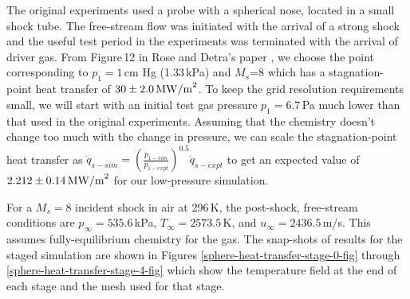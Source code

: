 \medskip
The original experiments used a probe with a spherical nose, located in a small shock tube.
The free-stream flow was initiated with the arrival of a strong shock and the useful test period 
in the experiments was terminated with the arrival of driver gas.
From Figure\,12 in Rose and Detra's paper \cite{rose_stark_58}, we choose the point corresponding to
$p_1 = 1$\,cm Hg (1.33\,kPa) and $M_s$=8 which has a stagnation-point heat transfer of $30\pm2.0\,{\rm MW/m}^2$.
To keep the grid resolution requirements small,
we will start with an initial test gas pressure $p_1 = 6.7$\,Pa much lower 
than that used in the original experiments.  
Assuming that the chemistry doesn't change too much with the change in pressure, we can scale the stagnation-point
heat transfer as $\dot{q}_{s-sim} = \left( \frac{p_{1-sim}}{p_{1-expt}} \right)^{0.5} \dot{q}_{s-expt}$ 
to get an expected value of $2.212\pm0.14\,{\rm MW/m}^2$ for our low-pressure simulation.

\medskip
For a $M_s = 8$ incident shock in air at 296\,K, the post-shock, free-stream conditions
are $p_{\infty} = 535.6$\,kPa, $T_{\infty} = 2573.5$\,K, and $u_{\infty} = 2436.5$\,m/s.
This assumes fully-equilibrium chemistry for the gas.
The snap-shots of results for the staged simulation are shown in Figures \ref{sphere-heat-transfer-stage-0-fig} through
\ref{sphere-heat-transfer-stage-4-fig} which show the temperature field at the end of each stage
and the mesh used for that stage. 

